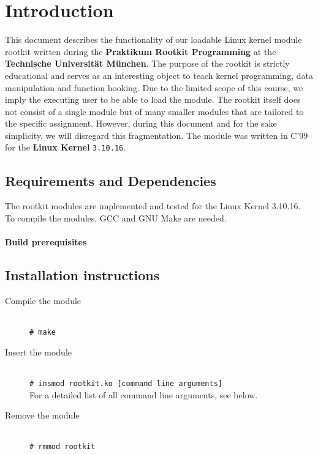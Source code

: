 \section{Introduction}
This document describes the functionality of our loadable Linux kernel module 
rootkit written during the \textbf{Praktikum Rootkit Programming} at the 
\textbf{Technische Universität München}. The purpose of the rootkit is strictly 
educational and serves as an interesting object to teach kernel programming, 
data manipulation and function hooking. Due to the limited scope of this 
course, we imply the executing user to be able to load the module. The rootkit 
itself does not consist of a single module but of many smaller modules that are 
tailored to the specific assignment. However, during this document and for the 
sake simplicity, we will disregard this fragmentation. The module was written in 
C'99 for the \textbf{Linux Kernel} \texttt{3.10.16}.

\subsection{Requirements and Dependencies}
The rootkit modules are implemented and tested for the Linux Kernel 
3.10.16.\\
To compile the modules, GCC and GNU Make are needed.
\paragraph*{Build prerequisites}

\subsection{Installation instructions}
\begin{description}
\item[Compile the module] \hfill\\
  \verb+# make+
\item[Insert the module] \hfill\\
  \verb+# insmod rootkit.ko [command line arguments]+\\
{\small For a detailed list of all command line arguments, see below.}
\item[Remove the module] \hfill\\
  \verb+# rmmod rootkit+   
\end{description}

